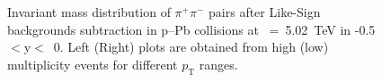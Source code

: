 \begin{figure}[hbt!]
	\caption{ Invariant mass distribution of $\pi^{+}\pi^{-}$ pairs after Like-Sign backgrounds subtraction in p--Pb collisions at \snn~=~5.02~TeV in -0.5~$<\mathrm{y}<$~0. Left (Right) plots are obtained from high (low) multiplicity events for different $p_{\mathrm{T}}$ ranges. 
	}
	\label{fig:SigExt}
\end{figure}

